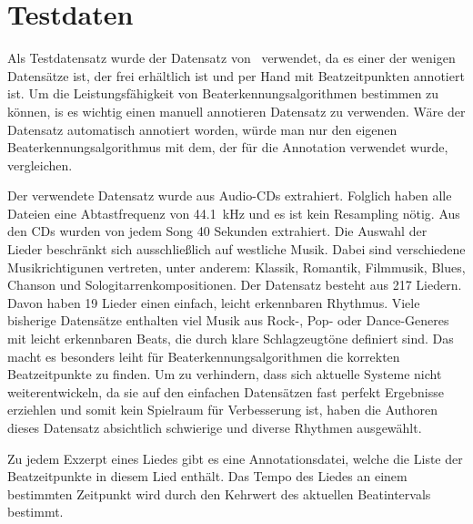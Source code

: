 \section{Testdaten} \label{konzept/testdaten}
{
	Als Testdatensatz wurde der Datensatz von~\cite{2012_HoDaZaOlGo} verwendet,
		da es einer der wenigen Datensätze ist,
		der frei erhältlich ist
		und per Hand mit Beatzeitpunkten annotiert ist.
	Um die Leistungsfähigkeit von Beaterkennungsalgorithmen bestimmen zu können,
		is es wichtig einen manuell annotieren Datensatz zu verwenden.
	Wäre der Datensatz automatisch annotiert worden,
		würde man nur den eigenen Beaterkennungsalgorithmus mit dem,
		der für die Annotation verwendet wurde,
		vergleichen.

	Der verwendete Datensatz wurde aus Audio-CDs extrahiert.
	Folglich haben alle Dateien eine Abtastfrequenz von \SI{44.1}{\kilo\hertz}
		und es ist kein Resampling nötig.
	Aus den CDs wurden von jedem Song \num{40} Sekunden extrahiert.
	Die Auswahl der Lieder beschränkt sich ausschließlich auf westliche Musik.
	Dabei sind verschiedene Musikrichtigunen vertreten,
		unter anderem: Klassik, Romantik, Filmmusik, Blues, Chanson und Sologitarrenkompositionen.
	Der Datensatz besteht aus 217 Liedern.
	Davon haben 19 Lieder einen einfach, leicht erkennbaren Rhythmus.
	Viele bisherige Datensätze enthalten viel Musik aus Rock-, Pop- oder Dance-Generes
		mit leicht erkennbaren Beats,
		die durch klare Schlagzeugtöne definiert sind.
	Das macht es besonders leiht für Beaterkennungsalgorithmen die korrekten Beatzeitpunkte zu finden.
	Um zu verhindern,
		dass sich aktuelle Systeme nicht weiterentwickeln,
		da sie auf den einfachen Datensätzen fast perfekt Ergebnisse erziehlen
		und somit kein Spielraum für Verbesserung ist,
		haben die Authoren dieses Datensatz absichtlich schwierige und diverse Rhythmen ausgewählt.

	Zu jedem Exzerpt eines Liedes gibt es eine Annotationsdatei,
		welche die Liste der Beatzeitpunkte in diesem Lied enthält.
	Das Tempo des Liedes an einem bestimmten Zeitpunkt wird durch den Kehrwert des aktuellen Beatintervals bestimmt.
}

